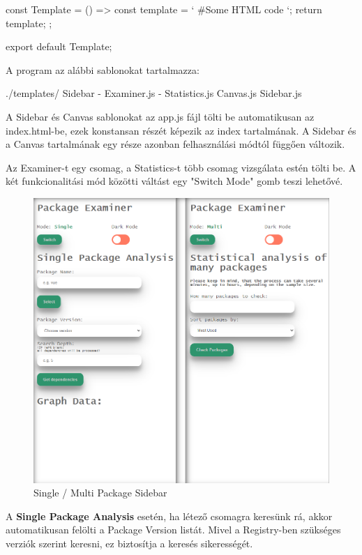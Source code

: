 \begin{cpp}
	const Template = () => {
		const template = `
		#Some HTML code
		`;
		return template;
	};

	export default Template;
\end{cpp}

A program az alábbi sablonokat tartalmazza:
\begin{cpp}
./templates/	
	Sidebar
	- Examiner.js
	- Statistics.js
	Canvas.js
	Sidebar.js
\end{cpp}

A Sidebar és Canvas sablonokat az app.js fájl tölti be automatikusan az index.html-be, ezek konstansan részét képezik az index tartalmának. A Sidebar és a Canvas tartalmának egy része azonban felhasználási módtól függően változik.

Az Examiner-t egy csomag, a Statistics-t több csomag vizsgálata estén tölti be. A két funkcionalitási mód közötti váltást egy "Switch Mode" gomb teszi lehetővé.\\

\begin{figure}[!h]
	\centering
	\includegraphics[scale=0.2]{images/ui_modes.png}
	\caption{Single / Multi Package Sidebar}
	\label{fig:ui_modes}
\end{figure}

\pagebreak


A \textbf{Single Package Analysis} esetén, ha létező csomagra keresünk rá, akkor automatikusan felölti a Package Version listát. Mivel a Registry-ben szükséges verziók szerint keresni, ez biztosítja a keresés sikerességét.\\

